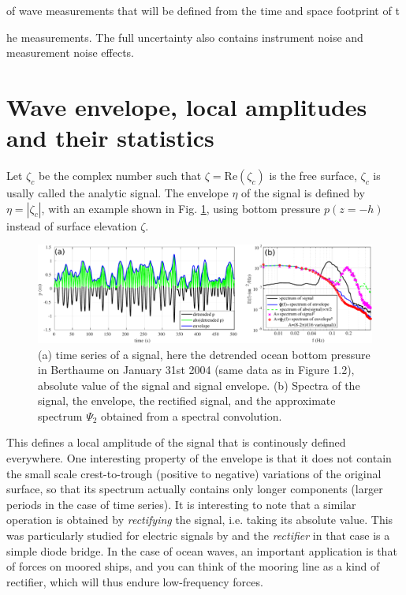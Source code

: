 of wave measurements that will be defined from the time and space footprint of t{he measurements. The full uncertainty also contains instrument noise and measurement noise effects.

\section{Wave envelope, local amplitudes and their statistics}

Let $\zeta_c$ be the complex number such that $\zeta = \mathrm{Re}(\zeta_c)$ is the free surface, $\zeta_c$  is usally called the analytic signal. The envelope $\eta$ of the signal is defined by  $\eta = |\zeta_c|$, with an example shown in Fig. \ref{fig:groups1D}, using bottom pressure $p(z=-h)$ instead of surface elevation $\zeta$. 
\begin{figure}[htb]
\centerline{\includegraphics[width=\textwidth]{FIGS_CH_GROUPS/envelope_1D.pdf}}
  \caption{(a) time series of a signal, here the detrended ocean bottom pressure in Berthaume on January 31st 2004 (same data as in Figure 1.2), absolute value of the signal and signal envelope. (b) Spectra of the signal, the envelope, the rectified signal, and the approximate spectrum $\Psi_2$ obtained from a spectral convolution.}
\label{fig:groups1D}
\end{figure}
This defines a local amplitude of the signal that is continously defined everywhere. One interesting property of the envelope is that it does not contain the small scale crest-to-trough (positive to negative) variations of the original surface, so that its spectrum actually contains only longer components (larger periods in the case of time series). It is interesting to note that a similar operation is obtained by \emph{rectifying} the signal, i.e. taking its absolute value. This was particularly studied for electric signals by \cite{Rice1944} and the \emph{rectifier} in that case is a simple diode bridge. In the case of ocean waves, an important application is that of forces on moored ships, and you can think of the mooring line as a kind of rectifier, which will thus endure low-frequency forces. 

}
